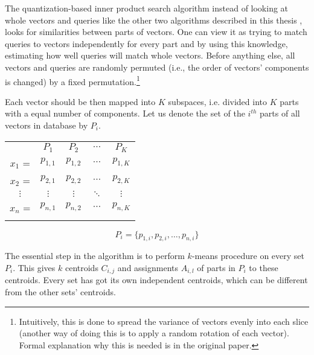 The quantization-based inner product search algorithm \cite{quantization}
instead of looking at whole vectors and queries like the other two algorithms described in this thesis ,
looks for similarities between parts of vectors.
One can view it as trying to match queries to vectors independently for every part and
by using this knowledge, estimating how well queries will match whole vectors.
Before anything else, all vectors and queries are randomly permuted 
(i.e., the order of vectors' components is changed)
by a fixed permutation.\footnote{
Intuitively, this is done to spread the variance of vectors evenly into each slice
(another way of doing this is to apply a random rotation of each vector). Formal
explanation why this is needed is in the original paper.
}

Each vector should be then mapped into $K$ subspaces, i.e. divided into $K$ parts with a equal number of components.
Let us denote the set of the $i^{th}$ parts of all vectors in database by $P_i$.
\begin{center}
\renewcommand{\arraystretch}{1.2}
\begin{tabular}{c|c|c|c|c|}
\multicolumn{1}{r}{} & \multicolumn{1}{c}{$P_{1}$} & \multicolumn{1}{c}{$P_{2}$}
& \multicolumn{1}{c}{$\cdots$} & \multicolumn{1}{c}{$P_{K}$} \\
\hhline{~----}
$x_1$ = & $p_{1,1}$ & $p_{1,2}$ & $\cdots$ & $p_{1,K}$ \\
\hhline{~----}
$x_2$ = & $p_{2,1}$ & $p_{2,2}$ & $\cdots$ & $p_{2,K}$ \\
\hhline{~----}
$\vdots$ & $\vdots$ & $\vdots$ & $\ddots$ & $\vdots$ \\
\hhline{~----}
$x_n$ = & $p_{n,1}$ & $p_{n,2}$ & $\cdots$ & $p_{n,K}$ \\
\hhline{~----}
\end{tabular}
\end{center}

\begin{equation*}
P_i = \{ p_{1,i}, p_{2,i}, \ldots, p_{n,i} \}
\end{equation*}

The essential step in the algorithm is to perform $k$-means  procedure on every set $P_i$.
This gives $k$ centroids $C_{i,j}$ and assignments $A_{i,l}$ of parts in $P_i$ to these centroids.
Every set has got its own independent centroids, which can be different from the other sets' centroids.

